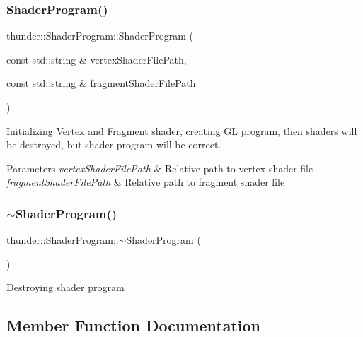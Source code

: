 \subsubsection{\texorpdfstring{Shader\+Program()}{ShaderProgram()}}
{\footnotesize\ttfamily thunder\+::\+Shader\+Program\+::\+Shader\+Program (\begin{DoxyParamCaption}\item[{const std\+::string \&}]{vertex\+Shader\+File\+Path,  }\item[{const std\+::string \&}]{fragment\+Shader\+File\+Path }\end{DoxyParamCaption})}

Initializing Vertex and Fragment shader, creating GL program, then shaders will be destroyed, but shader program will be correct. 
\begin{DoxyParams}{Parameters}
{\em vertex\+Shader\+File\+Path} & Relative path to vertex shader file \\
\hline
{\em fragment\+Shader\+File\+Path} & Relative path to fragment shader file \\
\hline
\end{DoxyParams}
\mbox{\label{classthunder_1_1_shader_program_abf3826a146b63b5fcb8214de236732ac}} 
\subsubsection{\texorpdfstring{$\sim$\+Shader\+Program()}{~ShaderProgram()}}
{\footnotesize\ttfamily thunder\+::\+Shader\+Program\+::$\sim$\+Shader\+Program (\begin{DoxyParamCaption}{ }\end{DoxyParamCaption})}

Destroying shader program 

\subsection{Member Function Documentation}
\mbox{\label{classthunder_1_1_shader_program_a10a375f97b7774beac6280db50318811}} 
